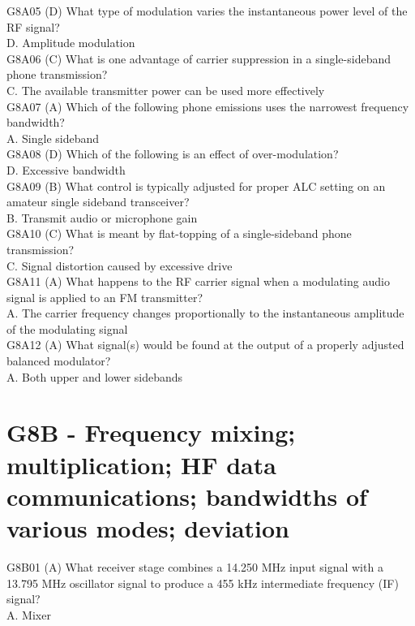 \documentclass[12pt,letterpaper]{report}
\begin{document}
G8A05 (D) What type of modulation varies the instantaneous power level of the RF signal?\\
D. Amplitude modulation\\

G8A06 (C) What is one advantage of carrier suppression in a single-sideband phone transmission?\\
C. The available transmitter power can be used more effectively\\

G8A07 (A) Which of the following phone emissions uses the narrowest frequency bandwidth?\\
A. Single sideband\\

G8A08 (D) Which of the following is an effect of over-modulation?\\
D. Excessive bandwidth\\

G8A09 (B) What control is typically adjusted for proper ALC setting on an amateur single sideband transceiver?\\
B. Transmit audio or microphone gain\\

G8A10 (C) What is meant by flat-topping of a single-sideband phone transmission?\\
C. Signal distortion caused by excessive drive\\

G8A11 (A) What happens to the RF carrier signal when a modulating audio signal is applied to an FM transmitter?\\
A. The carrier frequency changes proportionally to the instantaneous amplitude of the modulating signal\\

G8A12 (A) What signal(s) would be found at the output of a properly adjusted balanced modulator?\\
A. Both upper and lower sidebands\\

\section{G8B - Frequency mixing; multiplication; HF data communications; bandwidths of various modes; deviation}

G8B01 (A) What receiver stage combines a 14.250 MHz input signal with a 13.795 MHz oscillator signal to produce a 455 kHz intermediate frequency (IF) signal?\\
A. Mixer\\
\end{document}
